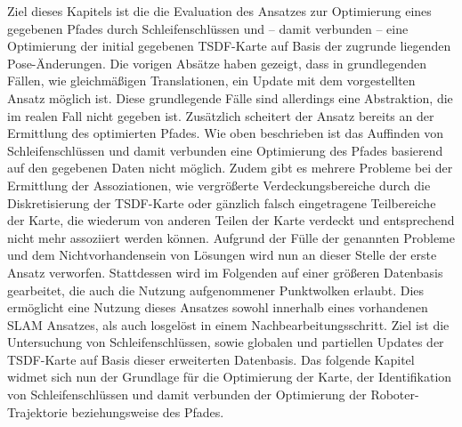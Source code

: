 Ziel dieses Kapitels ist die die Evaluation des Ansatzes zur Optimierung eines gegebenen Pfades durch Schleifenschlüssen und -- damit verbunden -- eine Optimierung der initial gegebenen TSDF-Karte auf Basis der zugrunde liegenden Pose-Änderungen. Die vorigen Absätze haben gezeigt, dass in grundlegenden Fällen, wie gleichmäßigen Translationen, ein Update mit dem vorgestellten Ansatz möglich ist. Diese grundlegende Fälle sind allerdings eine Abstraktion, die im realen Fall nicht gegeben ist. Zusätzlich scheitert der Ansatz bereits an der Ermittlung des optimierten Pfades. Wie oben beschrieben ist das Auffinden von Schleifenschlüssen und damit verbunden eine Optimierung des Pfades basierend auf den gegebenen Daten nicht möglich. Zudem gibt es mehrere Probleme bei der Ermittlung der Assoziationen, wie vergrößerte Verdeckungsbereiche durch die Diskretisierung der TSDF-Karte oder gänzlich falsch eingetragene Teilbereiche der Karte, die wiederum von anderen Teilen der Karte verdeckt und entsprechend nicht mehr assoziiert werden können. Aufgrund der Fülle der genannten Probleme und dem Nichtvorhandensein von Lösungen wird nun an dieser Stelle der erste Ansatz verworfen. Stattdessen wird im Folgenden auf einer größeren Datenbasis gearbeitet, die auch die Nutzung aufgenommener Punktwolken erlaubt. Dies ermöglicht eine Nutzung dieses Ansatzes sowohl innerhalb eines vorhandenen SLAM Ansatzes, als auch losgelöst in einem Nachbearbeitungsschritt. Ziel ist die Untersuchung von Schleifenschlüssen, sowie globalen und partiellen Updates der TSDF-Karte auf Basis dieser erweiterten Datenbasis. Das folgende Kapitel widmet sich nun der Grundlage für die Optimierung der Karte, der Identifikation von Schleifenschlüssen und damit verbunden der Optimierung der Roboter-Trajektorie beziehungsweise des Pfades.


